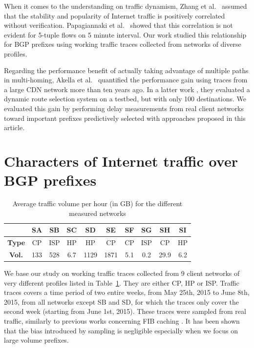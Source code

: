 When it comes to the understanding on traffic dynamism, Zhang et al.\ \cite{Zhang2012} assumed that the stability and popularity of Internet traffic is positively correlated without verification. 
Papagiannaki et al.\ \cite{Papagiannaki2004} showed that this correlation is not evident for 5-tuple flows on 5 minute interval. 
Our work studied this relationship for BGP prefixes using working traffic traces collected from networks of diverse profiles.

Regarding the performance benefit of actually taking advantage of multiple paths in multi-homing, Akella et al.\ \cite{Akella2003a} quantified the performance gain using traces from a large CDN network more than ten years ago. 
In a latter work \cite{Akella2008}, they evaluated a dynamic route selection system on a testbed, but with only 100 destinations. 
We evaluated this gain by performing delay measurements from real client networks toward important prefixes predictively selected with approaches proposed in this article.

\section{Characters of Internet traffic over BGP prefixes}
\label{sec:chp2_chara}
\begin{table}[!tb]
\centering
\footnotesize
\setlength{\tabcolsep}{0.5em}
\begin{tabular}{cccccccccc}
\toprule
 & \textbf{SA} & \textbf{SB} & \textbf{SC} & \textbf{SD} & \textbf{SE} & \textbf{SF} & \textbf{SG} & \textbf{SH} & \textbf{SI} \\
\midrule
\textbf{Type} & CP & ISP & HP & HP & CP & CP & ISP & CP & HP \\
\textbf{Vol.} & 133 & 528 & 6.7 & 1129 & 1871 & 5.1 & 0.2 & 29.9 & 6.2 \\
\bottomrule
\end{tabular}
\caption{Average traffic volume per hour (in GB) for the different measured networks}
\label{tab:network_type}
\end{table}

We base our study on working traffic traces collected from 9 client networks of very different profiles listed in Table~\ref{tab:network_type}. 
They are either \ac{CP}, \ac{HP} or \ac{ISP}. 
Traffic traces covers a time period of two entire weeks, from May 25th, 2015 to June 8th, 2015, from all networks except SB and SD, for which the traces only cover the second week (starting from June 1st, 2015).
These traces were sampled from real traffic, similarly to previous works concerning FIB caching \cite{Kim2009, Zhang2012}.
It has been shown that the bias introduced by sampling is negligible especially when we focus on large volume prefixes.

